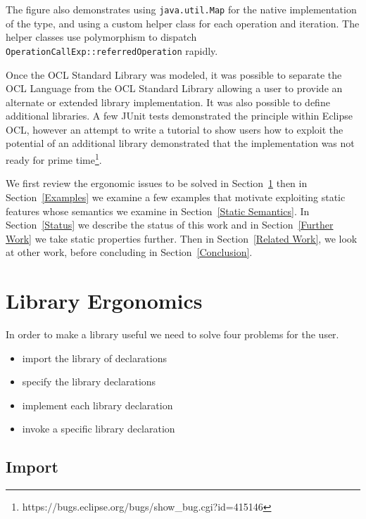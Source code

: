 \documentclass[sigconf]{acmart}
\begin{document}
The figure also demonstrates using \verb|java.util.Map| for the native implementation of the type, and using a custom helper class for each operation and iteration. The helper classes use polymorphism to dispatch \verb|OperationCallExp::referredOperation| rapidly.

Once the OCL Standard Library was modeled, it was possible to separate the OCL Language from the OCL Standard Library allowing a user to provide an alternate or extended library implementation. It was also possible to define additional libraries. A few JUnit tests demonstrated the principle within Eclipse OCL, however an attempt to write a tutorial to show users how to exploit the potential of an additional library demonstrated that the implementation was not ready for prime time\footnote{https://bugs.eclipse.org/bugs/show\_bug.cgi?id=415146}.


We first review the ergonomic issues to be solved in Section~\ref{Library Ergonomics} then in Section~\ref{Examples} we examine a few examples that motivate exploiting static features whose semantics we examine in Section~\ref{Static Semantics}. In Section~\ref{Status} we describe the status of this work and in Section~\ref{Further Work} we take static properties further. Then in Section~\ref{Related Work}, we look at other work, before concluding in Section~\ref{Conclusion}.
  
\section{Library Ergonomics}\label{Library Ergonomics}
 
In order to make a library useful we need to solve four problems for the user.

\begin{itemize}
	\item import the library of declarations
	\item specify the library declarations
	\item implement each library declaration
	\item invoke a specific library declaration
\end{itemize}

\subsection{Import}
 
\end{document}
